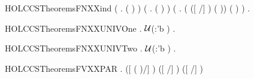 \begin{SaveVerbatim}{HOLCCSTheoremsFNXXind}
       (\HOLSymConst{\HOLTokenForall{}}  .    \HOLSymConst{\HOLTokenImp{}}  (  ) ) \HOLSymConst{\HOLTokenConj{}}
       (\HOLSymConst{\HOLTokenForall{}} .  ( ) ) \HOLSymConst{\HOLTokenConj{}}
       (\HOLSymConst{\HOLTokenForall{}}  .
            (   \HOLSymConst{\HOLTokenImp{}}  ([  /] ) (  )) \HOLSymConst{\HOLTokenImp{}}
             (  ) ) \HOLSymConst{\HOLTokenImp{}}
       \HOLSymConst{\HOLTokenForall{}} .   
\end{SaveVerbatim}
\newcommand{\HOLCCSTheoremsFNXXind}{\UseVerbatim{HOLCCSTheoremsFNXXind}}
\begin{SaveVerbatim}{HOLCCSTheoremsFNXXUNIVOne}
\HOLTokenTurnstile{} \HOLSymConst{\HOLTokenForall{}}.   \HOLSymConst{\HOLTokenNotEqual{}} \ensuremath{{\cal{U}}}(:'b ) \HOLSymConst{\HOLTokenImp{}} \HOLSymConst{\HOLTokenExists{}}.  \HOLConst{\HOLTokenNotIn{}}  
\end{SaveVerbatim}
\newcommand{\HOLCCSTheoremsFNXXUNIVOne}{\UseVerbatim{HOLCCSTheoremsFNXXUNIVOne}}
\begin{SaveVerbatim}{HOLCCSTheoremsFNXXUNIVTwo}
\HOLTokenTurnstile{} \HOLSymConst{\HOLTokenForall{}} .
         \HOLConst{\HOLTokenUnion{}}   \HOLSymConst{\HOLTokenNotEqual{}} \ensuremath{{\cal{U}}}(:'b ) \HOLSymConst{\HOLTokenImp{}}
       \HOLSymConst{\HOLTokenExists{}}.  \HOLConst{\HOLTokenNotIn{}}   \HOLSymConst{\HOLTokenConj{}}  \HOLConst{\HOLTokenNotIn{}}  
\end{SaveVerbatim}
\newcommand{\HOLCCSTheoremsFNXXUNIVTwo}{\UseVerbatim{HOLCCSTheoremsFNXXUNIVTwo}}
\begin{SaveVerbatim}{HOLCCSTheoremsFVXXPAR}
\HOLTokenTurnstile{} \HOLSymConst{\HOLTokenForall{}}   .
        ([  ( \HOLSymConst{\ensuremath{\parallel}} )/] ) \HOLSymConst{=}
        ([  /] ) \HOLConst{\HOLTokenUnion{}}  ([  /] )
\end{SaveVerbatim}
